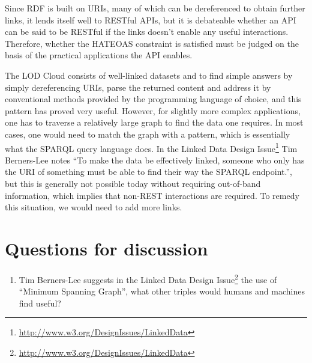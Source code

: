 \documentclass{llncs}
\begin{document}
Since RDF is built on URIs, many of which can be dereferenced to
obtain further links, it lends itself well to RESTful APIs, but it is
debateable whether an API can be said to be RESTful if the links
doesn't enable any useful interactions. Therefore, whether the HATEOAS
constraint is satisfied must be judged on the basis of the practical
applications the API enables.

The LOD Cloud consists of well-linked datasets and to find simple
answers by simply dereferencing URIs, parse the returned content and
address it by conventional methods provided by the programming
language of choice, and this pattern has proved very useful. However,
for slightly more complex applications, one has to traverse a
relatively large graph to find the data one requires. In most cases,
one would need to match the graph with a pattern, which is essentially
what the SPARQL query language does. In the Linked Data Design
Issue\footnote{\url{http://www.w3.org/DesignIssues/LinkedData}} Tim
Berners-Lee notes ``To make the data be effectively linked, someone
who only has the URI of something must be able to find their way the
SPARQL endpoint.'', but this is generally not possible today without
requiring out-of-band information, which implies that non-REST
interactions are required. To remedy this situation, we would need to
add more links.


\section{Questions for discussion}

\begin{enumerate}
\item Tim Berners-Lee suggests in the Linked Data Design
  Issue\footnote{\url{http://www.w3.org/DesignIssues/LinkedData}} the
  use of ``Minimum Spanning Graph'', what other triples would humans
  and machines find useful?

\end{enumerate}


%
%
%
%
\end{document}
